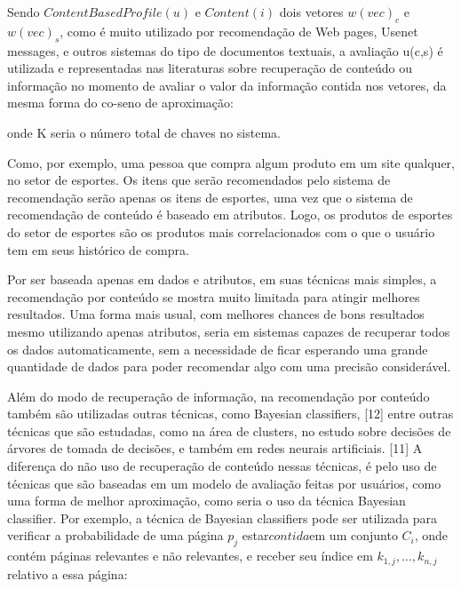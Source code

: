 \documentclass[12pt,
				openright,
				twoside,
				a4paper,
				apter=TITLE,
				section=TITLE,
				subsection=TITLE,
				chapter=TITLE,
				english,
				brazil]{abntex2}
\begin{document}
Sendo $ContentBasedProfile(u)$ e $Content(i)$ dois vetores $w(vec)_c$ e $w(vec)_s$, como é muito utilizado por recomendação de Web pages, Usenet messages, e outros sistemas do tipo de documentos textuais, a avaliação u(c,s) é utilizada e representadas nas literaturas sobre recuperação de conteúdo ou informação no momento de avaliar o valor da informação contida nos vetores, da mesma forma do co-seno de aproximação:


onde K seria o número total de chaves no sistema.

Como, por exemplo, uma pessoa que compra algum produto em um site qualquer, no setor de esportes. Os itens que serão recomendados pelo sistema de recomendação serão apenas os itens de esportes, uma vez que o sistema de recomendação de conteúdo é baseado em atributos. Logo, os produtos de esportes do setor de esportes são os produtos mais correlacionados com o que o usuário tem em seus histórico de compra. 

Por ser baseada apenas em dados e atributos, em suas técnicas mais simples, a recomendação por conteúdo se mostra muito limitada para atingir melhores resultados. Uma forma mais usual, com melhores chances de bons resultados mesmo utilizando apenas atributos, seria em sistemas capazes de recuperar todos os dados automaticamente, sem a necessidade de ficar esperando uma grande quantidade de dados para poder recomendar algo com uma precisão considerável. 

Além do modo de recuperação de informação, na recomendação por conteúdo também são utilizadas outras técnicas, como Bayesian classifiers, [12] entre outras técnicas que são estudadas, como na área de clusters, no estudo sobre decisões de árvores de tomada de decisões, e também em redes neurais artificiais. [11] A diferença do não uso de recuperação de conteúdo nessas técnicas, é pelo uso de técnicas que são baseadas em um modelo de avaliação feitas por usuários, como uma forma de melhor aproximação, como seria o uso da técnica Bayesian classifier. Por exemplo, a técnica de Bayesian classifiers pode ser utilizada para verificar a probabilidade de uma página $p_j$ estar$ contida $em um conjunto $C_i$, onde contém páginas relevantes e não relevantes, e receber seu índice em $k_{1,j},...,k_{n,j}$ relativo a essa página:
\end{document}
